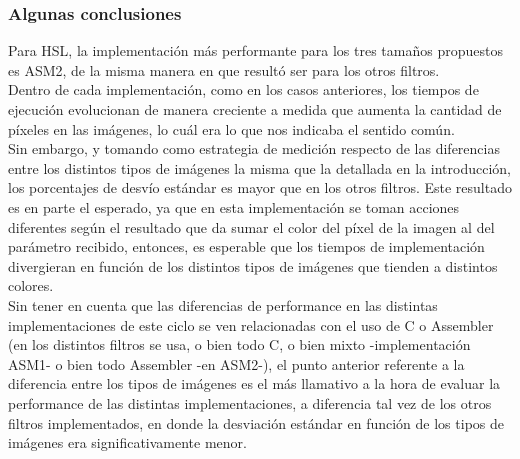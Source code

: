 \subsubsection{Algunas conclusiones}
Para HSL, la implementación más performante para los tres tamaños propuestos es ASM2, de la misma manera en que resultó ser para los otros filtros.\\
Dentro de cada implementación, como en los casos anteriores, los tiempos de ejecución evolucionan de manera creciente a medida que aumenta la cantidad de píxeles en las imágenes, lo cuál era lo que nos indicaba el sentido común.\\

Sin embargo, y tomando como estrategia de medición respecto de las diferencias entre los distintos tipos de imágenes la misma que la detallada en la introducción, los porcentajes de desvío estándar es mayor que en los otros filtros. Este resultado es en parte el esperado, ya que en esta implementación se toman acciones diferentes según el resultado que da sumar el color del píxel de la imagen al del parámetro recibido, entonces, es esperable que los tiempos de implementación divergieran en función de los distintos tipos de imágenes que tienden a distintos colores.\\

Sin tener en cuenta que las diferencias de performance en las distintas implementaciones de este ciclo se ven relacionadas con el uso de C o Assembler (en los distintos filtros se usa, o bien todo C, o bien mixto -implementación ASM1- o bien todo Assembler -en ASM2-), el punto anterior referente a la diferencia entre los tipos de imágenes es el más llamativo a la hora de evaluar la performance de las distintas implementaciones, a diferencia tal vez de los otros filtros implementados, en donde la desviación estándar en función de los tipos de imágenes era significativamente menor. 